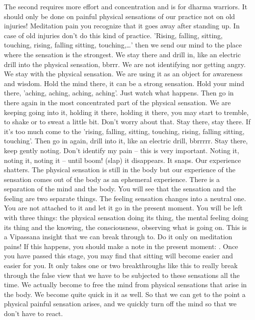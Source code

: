 \documentclass[letterpaper,10pt,english]{sphinxmanual}
\begin{document}
\sphinxAtStartPar
The second requires more effort and concentration and is for dharma
warriors. It should only be done on painful physical sensations of our practice not on old injuries! Meditation pain you recognize that it goes away after
standing up. In case of old injuries don’t do this kind of practice. ’Rising,
falling,  sitting,  touching,  rising,  falling  sitting,  touching,…’  then  we  send
our  mind  to  the  place  where  the  sensation  is  the  strongest.  We  stay  there
and drill in, like an electric drill into the physical sensation, bbrrr. We are
not identifying nor getting angry. We stay with the physical sensation. We
are using it as an object for awareness and wisdom. Hold the mind there, it
can  be  a  strong  sensation.  Hold  your  mind  there,  ’aching,  aching,  aching,
aching’. Just watch what happens. Then go in there again in the most concentrated part of the physical sensation. We are keeping going into it, holding it there, holding it there, you may start to tremble, to shake or to sweat
  a little bit. Don’t worry about that. Stay there, stay there. If it’s too much
come to the ’rising, falling, sitting, touching, rising, falling sitting, touching’. Then go in again, drill into it, like an electric drill, bbrrrrr. Stay there,
keep gently noting. Don’t identify my pain – this is very important. Noting
it, noting it, noting it – until boom! (slap) it disappears. It snaps. Our experience shatters. The physical sensation is still in the body but our experience
of the sensation comes out of the body as an ephemeral experience. There is
a separation of the mind and the body. You will see that the sensation and the
feeling are two separate things. The feeling sensation changes into a neutral
one. You are not attached to it and let it go in the present moment. You will
be left with three things: the physical sensation doing its thing, the mental
feeling doing its thing and the knowing, the consciousness, observing what
is going on. This is a Vipassana insight that we can break through to. Do it
only  on  meditation  pains!  If  this  happens,  you  should  make  a  note  in  the
present moment:
.
Once
you have passed this stage, you may find that sitting will become easier and
easier for you. It only takes one or two breakthroughs like this to really break
through the false view that we have to be subjected to these sensations all
the time. We actually become to free the mind from physical sensations that
arise in the body. We become quite quick in it as well. So that we can get
to the point a physical painful sensation arises, and we quickly turn off the
mind so that we don’t have to react.
\end{document}
